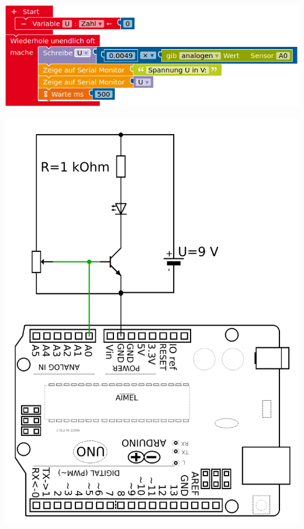 \begin{aufgabe}
\begin{minipage}[c][8cm][t]{0.58\textwidth}
		\begin{center}
			\includegraphics[width=\textwidth]{./pics/spannung-an-transistor-messen.png}
		\end{center}
	\end{minipage}
	\hfill
	\begin{minipage}[c][8cm][t]{0.38\textwidth}
		\centering
		\includegraphics[width=\textwidth]{./Zeichnungen/Schaltplan-U-BE-Messung.png}
	\end{minipage}
\end{aufgabe}

